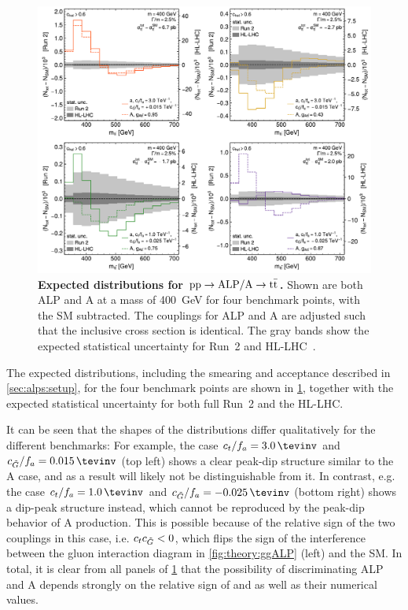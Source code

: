 \begin{figure}[t]
    \centering
    \includegraphics[width=0.99\linewidth]{figures/alps/mttplots.pdf}
    \caption{\textbf{Expected \mtt distributions for $\mathrm{pp \rightarrow ALP/A \rightarrow \mathrm{t \bar{t}}}$.} Shown are both ALP and A at a mass of \SI{400}{\GeV} for four benchmark points, with the SM subtracted. The couplings for ALP and A are adjusted such that the inclusive cross section is identical. The gray bands show the expected statistical uncertainty for Run~2 and HL-LHC~\cite{Jeppe:2024sxt}.
    }
    \label{fig:alps:mttplots}
\end{figure}

The expected \mtt distributions, including the smearing and acceptance described in \cref{sec:alps:setup}, for the four benchmark points are shown in \cref{fig:alps:mttplots}, together with the expected statistical uncertainty for both full Run~2 and the HL-LHC. 

It can be seen that the shapes of the distributions differ qualitatively for the different benchmarks: For example, the case $\ct/f_a = \SI{3.0}{\tevinv}$ and $\cG/f_a = \SI{+0.015}{\tevinv}$ (top left) shows a clear peak-dip structure similar to the A case, and as a result will likely not be distinguishable from it. In contrast, e.g. the case $\ct/f_a = \SI{1.0}{\tevinv}$ and $\cG/f_a = \SI{-0.025}{\tevinv}$ (bottom right) shows a dip-peak structure instead, which cannot be reproduced by the peak-dip behavior of A production. This is possible because of the relative sign of the two couplings in this case, i.e. $c_t c_{\tilde{G}} < 0$, which flips the sign of the interference between the gluon interaction diagram in \cref{fig:theory:ggALP} (left) and the SM.
In total, it is clear from all panels of \cref{fig:alps:mttplots} that the possibility of discriminating ALP and A depends strongly on the relative sign of \ct and \cG as well as their numerical values.

